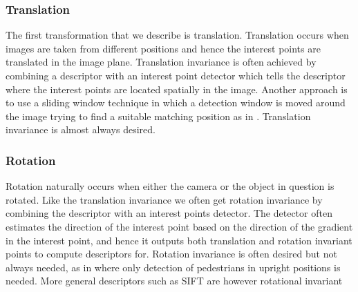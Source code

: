 \documentclass[thesis.tex]{subfiles}
\begin{document}

\subsubsection{Translation}
The first transformation that we describe is translation. Translation occurs when images are taken from different positions and hence the interest points are translated in the image plane. Translation invariance is often achieved by combining a descriptor with an interest point detector which tells the descriptor where the interest points are located spatially in the image. Another approach is to use a sliding window technique in which a detection window is moved around the image trying to find a suitable matching position as in \cite{felzenszwalb2008discriminatively}. Translation invariance is almost always desired.


\subsubsection{Rotation}
Rotation naturally occurs when either the camera or the object in question is rotated. Like the translation invariance we often get rotation invariance by combining the descriptor with an interest points detector. The detector often estimates the direction of the interest point based on the direction of the gradient in the interest point, and hence it outputs both translation and rotation invariant points to compute descriptors for. Rotation invariance is often desired but not always needed, as in \cite{dalal2005histograms,felzenszwalb2008discriminatively} where only detection of pedestrians in upright positions is needed. More general descriptors such as SIFT are however rotational invariant


\end{document}

